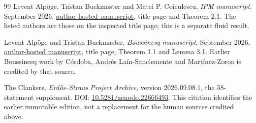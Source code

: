 \begin{thebibliography}{99}
Levent Alp\"oge, Tristan Buckmaster and Matei P. Coiculescu,
\emph{IPM manuscript}, September 2026,
\href{https://cims.nyu.edu/~tristanb/ipm.pdf}{author-hosted manuscript},
title page and Theorem 2.1. The listed authors are those on the inspected
title page; this is a separate fluid result.

Levent Alp\"oge and Tristan Buckmaster,
\emph{Boussinesq manuscript}, September 2026,
\href{https://cims.nyu.edu/~tristanb/boussinesq.pdf}{author-hosted manuscript},
title page, Theorem 1.1 and Lemma 3.1.
Earlier Boussinesq work by C\'ordoba, Andr\'es La\'in-Sanclemente and
Mart\'inez-Zoroa is credited by that source.

The Clankers, \emph{Erd\H{o}s--Straus Project Archive},
version 2026.09.08.1, the 58-statement supplement.
DOI: \href{https://doi.org/10.5281/zenodo.22666493}{10.5281/zenodo.22666493}.
This citation identifies the earlier immutable edition, not a replacement
for the human sources credited above.
\end{thebibliography}
